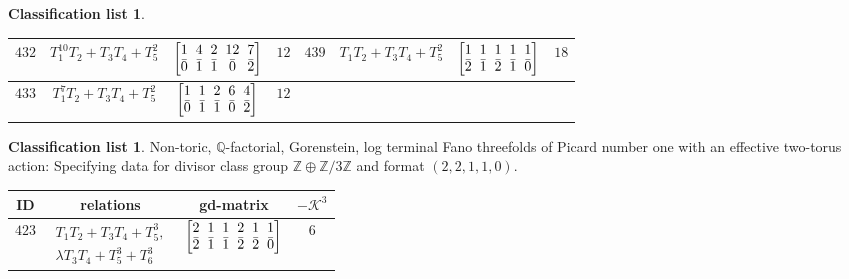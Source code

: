 \documentclass[pdftex]{sigma}%
\theoremstyle{definition}
\newtheorem{class-list}[thm]{Classification list}
\def\ZZ{{\mathbb Z}}
\def\QQ{{\mathbb Q}}
\numberwithin{equation}{section}
\begin{document}
\begin{class-list}
\begin{table}[h!]
\begin{tabu}{c|c|c|c||c|c|c|c}
\\
\hline
${432}$&${T_{1}^{10}T_{2}+T_{3}T_{4}+T_{5}^{2}}$
&$\arraycolsep=1mm\begin{bmatrix}{1} & {4} & {2} & {12} & {7} \\ {\bar{0}} & {\bar{1}} & {\bar{1}} & {\bar{0}} & {\bar{2}}\end{bmatrix}$&${12}$
&${439}$&${T_{1}T_{2}+T_{3}T_{4}+T_{5}^{2}}$
&$\arraycolsep=1mm\begin{bmatrix}{1} & {1} & {1} & {1} & {1} \\ {\bar{2}} & {\bar{1}} & {\bar{2}} & {\bar{1}} & {\bar{0}}\end{bmatrix}$&${18}$
\\
\hline
${433}$&${T_{1}^{7}T_{2}+T_{3}T_{4}+T_{5}^{2}}$
&$\arraycolsep=1mm\begin{bmatrix}{1} & {1} & {2} & {6} & {4} \\ {\bar{0}} & {\bar{1}} & {\bar{1}} & {\bar{0}} & {\bar{2}}\end{bmatrix}$&${12}$
\\
\end{tabu}%
\end{table}
\end{class-list}

\begin{class-list}
Non-toric, $\QQ$-factorial, Gorenstein, log terminal Fano
threefolds of Picard number one with an effective two-torus action:
Specifying data for divisor class group $\ZZ\oplus \ZZ/3\ZZ$
and format $(2,2,1,1,0)$.
\begin{table}[h!]\centering\setlength{\tabcolsep}{5.5pt}
\renewcommand{\arraystretch}{1.35}\small\tabulinesep=1mm
\begin{tabu}{c|c|c|c}
\hline
ID&relations&gd-matrix&$-\mathcal{K}^3$
\\
\hline
${423}$&$\begin{array}{r}{T_{1}T_{2}+T_{3}T_{4}+T_{5}^{3}},\\ {\lambda T_{3}T_{4}+T_{5}^{3}+T_{6}^{3}}\end{array}$
&$\arraycolsep=1mm\begin{bmatrix}{2} & {1} & {1} & {2} & {1} & {1} \\ {\bar{2}} & {\bar{1}} & {\bar{1}} & {\bar{2}} & {\bar{2}} & {\bar{0}}\end{bmatrix}$&${6}$
\\
\hline
\end{tabu}\vspace{2mm}
\end{table}
\end{class-list}
\end{document}
